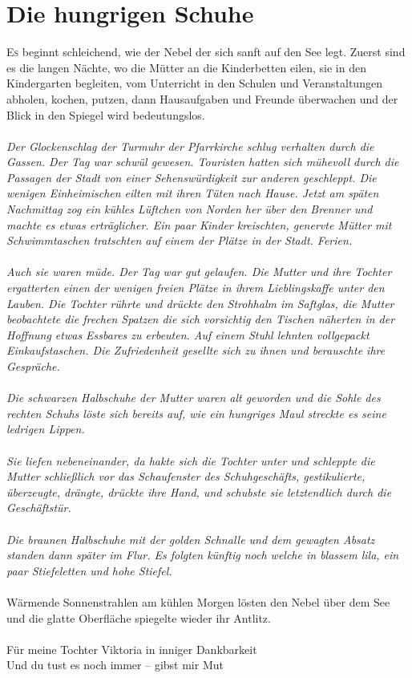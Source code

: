 \chapter{Die hungrigen Schuhe
}

\lettrine{E}{s} beginnt schleichend, wie der Nebel der sich sanft auf den See legt. Zuerst sind es die langen Nächte, wo die Mütter an die Kinderbetten eilen, sie in den Kindergarten begleiten, vom Unterricht in den Schulen und Veranstaltungen abholen, kochen, putzen, dann Hausaufgaben und Freunde überwachen und der Blick in den Spiegel wird bedeutungslos. \\\\
\textit{Der Glockenschlag der Turmuhr der Pfarrkirche schlug verhalten durch die Gassen. Der Tag war schwül gewesen. Touristen hatten sich mühevoll durch die Passagen der Stadt von einer Sehenswürdigkeit zur anderen geschleppt. Die wenigen Einheimischen eilten mit ihren Tüten nach Hause. Jetzt am späten Nachmittag zog ein kühles Lüftchen von Norden her über den Brenner und machte es etwas erträglicher. Ein paar Kinder kreischten, genervte Mütter mit Schwimmtaschen tratschten auf einem der Plätze in der Stadt. Ferien.\\\\
Auch sie waren müde. Der Tag war gut gelaufen. Die Mutter und ihre Tochter ergatterten einen der wenigen freien Plätze in ihrem Lieblingskaffe unter den Lauben. Die Tochter rührte und drückte den Strohhalm im Saftglas, die Mutter beobachtete die frechen Spatzen die sich vorsichtig den Tischen näherten in der Hoffnung etwas Essbares zu erbeuten. Auf einem Stuhl lehnten vollgepackt Einkaufstaschen. Die Zufriedenheit gesellte sich zu ihnen und berauschte ihre Gespräche. \\\\
Die schwarzen Halbschuhe der Mutter waren alt geworden und die Sohle des rechten Schuhs löste sich bereits auf, wie ein hungriges Maul streckte es seine ledrigen Lippen.\\\\
Sie liefen nebeneinander, da hakte sich die Tochter unter und schleppte die Mutter schließlich vor das Schaufenster des Schuhgeschäfts, gestikulierte, überzeugte, drängte, drückte ihre Hand, und schubste sie letztendlich durch die Geschäftstür. \\\\
Die braunen Halbschuhe mit der golden Schnalle und dem gewagten Absatz standen dann später im Flur. Es folgten künftig noch welche in blassem lila, ein paar Stiefeletten und hohe Stiefel.}\\\\

Wärmende Sonnenstrahlen am kühlen Morgen lösten den Nebel über dem See und die glatte Oberfläche spiegelte wieder ihr Antlitz.\\\\

Für meine Tochter Viktoria in inniger Dankbarkeit\\
Und du tust es noch immer – gibst mir Mut